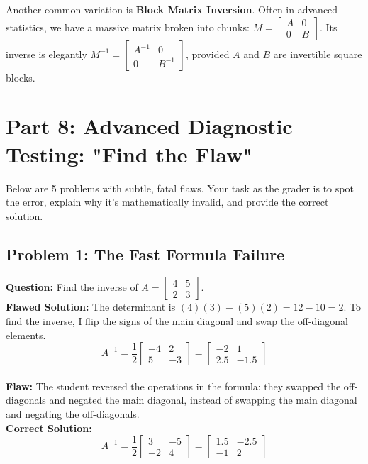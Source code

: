 \documentclass[11pt]{article}
\begin{document}
Another common variation is \textbf{Block Matrix Inversion}. Often in advanced statistics, we have a massive matrix broken into chunks: $M = \begin{bmatrix} A & 0 \\ 0 & B \end{bmatrix}$. Its inverse is elegantly $M^{-1} = \begin{bmatrix} A^{-1} & 0 \\ 0 & B^{-1} \end{bmatrix}$, provided $A$ and $B$ are invertible square blocks.

\newpage
\section{Part 8: Advanced Diagnostic Testing: "Find the Flaw"}

Below are 5 problems with subtle, fatal flaws. Your task as the grader is to spot the error, explain why it's mathematically invalid, and provide the correct solution.

\subsection{Problem 1: The Fast Formula Failure}
\textbf{Question:} Find the inverse of $A = \begin{bmatrix} 4 & 5 \\ 2 & 3 \end{bmatrix}$.
\\
\textbf{Flawed Solution:}
The determinant is $(4)(3) - (5)(2) = 12 - 10 = 2$.
To find the inverse, I flip the signs of the main diagonal and swap the off-diagonal elements.
\[ A^{-1} = \frac{1}{2} \begin{bmatrix} -4 & 2 \\ 5 & -3 \end{bmatrix} = \begin{bmatrix} -2 & 1 \\ 2.5 & -1.5 \end{bmatrix} \]
\\
\textbf{Flaw:} The student reversed the operations in the formula: they swapped the off-diagonals and negated the main diagonal, instead of swapping the main diagonal and negating the off-diagonals.
\\
\textbf{Correct Solution:}
\[ A^{-1} = \frac{1}{2} \begin{bmatrix} 3 & -5 \\ -2 & 4 \end{bmatrix} = \begin{bmatrix} 1.5 & -2.5 \\ -1 & 2 \end{bmatrix} \]
\end{document}
